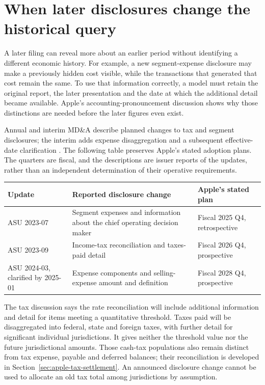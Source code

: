 \section{When later disclosures change the historical query}
\label{sec:apple-pronouncements}

A later filing can reveal more about an earlier period without identifying a
different economic history. For example, a new segment-expense disclosure may
make a previously hidden cost visible, while the transactions that generated
that cost remain the same. To use that information correctly, a model must
retain the original report, the later presentation and the date at which the
additional detail became available. Apple's accounting-pronouncement discussion
shows why those distinctions are needed before the later figures even exist.

Annual and interim MD\&A describe planned changes to tax and segment disclosures;
the interim adds expense disaggregation and a subsequent effective-date
clarification \citep[Recent Accounting Pronouncements, printed p.~26]{apple2024}
\citep[Recent Accounting Pronouncements, printed p.~17]{apple2025q1}.
The following table preserves Apple's stated adoption plans. The quarters are
fiscal, and the descriptions are issuer reports of the updates, rather than an
independent determination of their operative requirements.
\begin{center}
\small
\begin{tabular}{p{}p{}p{}}
\toprule
Update & Reported disclosure change & Apple's stated plan\\\midrule
ASU 2023-07 & Segment expenses and information about the chief operating
decision maker & Fiscal 2025 Q4, retrospective\\
ASU 2023-09 & Income-tax reconciliation and taxes-paid detail & Fiscal 2026 Q4,
prospective\\
ASU 2024-03, clarified by 2025-01 & Expense components and selling-expense
amount and definition & Fiscal 2028 Q4, prospective\\\bottomrule
\end{tabular}
\end{center}

The tax discussion says the rate reconciliation will include additional
information and detail for items meeting a quantitative threshold. Taxes paid
will be disaggregated into federal, state and foreign taxes, with further detail
for significant individual jurisdictions. It gives neither the threshold value
nor the future jurisdictional amounts. Those cash-tax populations also remain
distinct from tax expense, payable and deferred balances; their reconciliation
is developed in Section~\ref{sec:apple-tax-settlement}.
An announced disclosure change cannot be used to allocate an old tax total
among jurisdictions by assumption.

